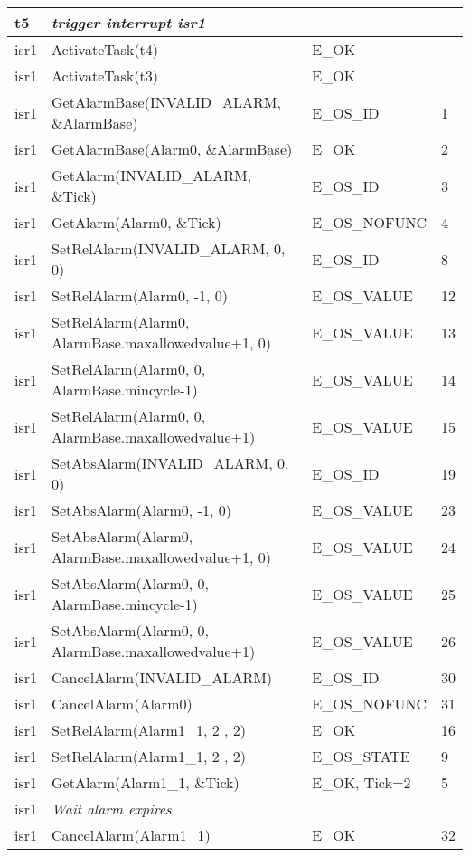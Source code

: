 \documentclass[10pt]{article}
\newlength{\Li}\settowidth{\Li}{Running}
\newlength{\Lii}\setlength{\Lii}{7cm}
\newlength{\Liiii}\setlength{\Liiii}{0.9cm}
\newlength{\Liii}\setlength{\Liii}{\textwidth} \addtolength{\Liii}{-\Li} \addtolength{\Liii}{-\Lii} \addtolength{\Liii}{-\Liiii}
\begin{document}
	\begin{supertabular}{|p{\Li}|p{\Lii}|p{\Liii}|p{\Liiii}|} \hline 
	t5	& \textit{trigger interrupt isr1}			 				& 						& \\ \hline 
	isr1	& ActivateTask(t4)									& E\_OK					& \\ \hline
	isr1	& ActivateTask(t3)									& E\_OK					& \\ \hline
	isr1	& GetAlarmBase(INVALID\_ALARM, \&AlarmBase)			& E\_OS\_ID				& 1 \\ \hline
	isr1	& GetAlarmBase(Alarm0, \&AlarmBase)					& E\_OK 					& 2 \\ \hline
	isr1	& GetAlarm(INVALID\_ALARM, \&Tick) 					& E\_OS\_ID				& 3 \\ \hline
	isr1	& GetAlarm(Alarm0, \&Tick)		 					& E\_OS\_NOFUNC			& 4 \\ \hline
	
	isr1	& SetRelAlarm(INVALID\_ALARM, 0, 0)					& E\_OS\_ID 				& 8 \\ \hline
	isr1	& SetRelAlarm(Alarm0, -1, 0)							& E\_OS\_VALUE 			& 12 \\ \hline
	isr1	& SetRelAlarm(Alarm0, AlarmBase.maxallowedvalue+1, 0)	& E\_OS\_VALUE			& 13 \\ \hline
	isr1	& SetRelAlarm(Alarm0, 0, AlarmBase.mincycle-1)			& E\_OS\_VALUE			& 14 \\ \hline
	isr1	& SetRelAlarm(Alarm0, 0, AlarmBase.maxallowedvalue+1)	& E\_OS\_VALUE 			& 15 \\ \hline
	isr1	& SetAbsAlarm(INVALID\_ALARM, 0, 0)					& E\_OS\_ID 				& 19 \\ \hline
	isr1	& SetAbsAlarm(Alarm0, -1, 0)							& E\_OS\_VALUE			& 23 \\ \hline
	isr1	& SetAbsAlarm(Alarm0, AlarmBase.maxallowedvalue+1, 0)	& E\_OS\_VALUE 			& 24 \\ \hline
	isr1	& SetAbsAlarm(Alarm0, 0, AlarmBase.mincycle-1) 			& E\_OS\_VALUE			& 25 \\ \hline
	isr1	& SetAbsAlarm(Alarm0, 0, AlarmBase.maxallowedvalue+1)	& E\_OS\_VALUE			& 26 \\ \hline
	isr1	& CancelAlarm(INVALID\_ALARM) 						&E\_OS\_ID				& 30 \\ \hline
	isr1	& CancelAlarm(Alarm0)	 							&E\_OS\_NOFUNC			& 31 \\ \hline
	
	isr1	& SetRelAlarm(Alarm1\_1, 2 , 2)						& E\_OK					& 16 \\ \hline
	isr1	& SetRelAlarm(Alarm1\_1, 2 , 2)						& E\_OS\_STATE			& 9 \\ \hline
	isr1	& GetAlarm(Alarm1\_1, \&Tick)							& E\_OK, Tick=2			& 5 \\ \hline
	isr1	& \textit{Wait alarm expires}						 	& 						& \\ \hline 
	isr1	& CancelAlarm(Alarm1\_1)							& E\_OK					& 32 \\ \hline
	

\end{supertabular}
\end{document}
